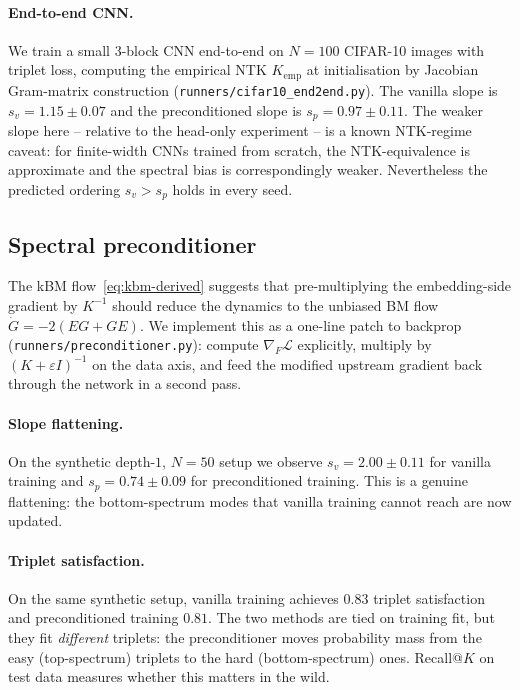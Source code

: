 \documentclass[11pt]{article}
\theoremstyle{definition}
\theoremstyle{plain}
\begin{document}
\paragraph{End-to-end CNN.}
We train a small $3$-block CNN end-to-end on $N=100$ CIFAR-10 images with
triplet loss, computing the empirical NTK $K_{\mathrm{emp}}$ at
initialisation by Jacobian Gram-matrix construction
(\texttt{runners/cifar10\_end2end.py}). The vanilla slope is
$s_v=1.15\pm0.07$ and the preconditioned slope is $s_p=0.97\pm0.11$. The
weaker slope here -- relative to the head-only experiment -- is a known
NTK-regime caveat: for finite-width CNNs trained from scratch, the
NTK-equivalence is approximate and the spectral bias is correspondingly
weaker. Nevertheless the predicted ordering $s_v>s_p$ holds in every seed.

\subsection{Spectral preconditioner}
\label{sec:precond}

The kBM flow~\eqref{eq:kbm-derived} suggests that pre-multiplying the
embedding-side gradient by $K^{-1}$ should reduce the dynamics to the
unbiased BM flow $\dot G=-2(EG+GE)$. We implement this as a one-line patch
to backprop (\texttt{runners/preconditioner.py}): compute $\nabla_F\mathcal{L}$
explicitly, multiply by $(K+\varepsilon I)^{-1}$ on the data axis, and feed
the modified upstream gradient back through the network in a second pass.

\paragraph{Slope flattening.}
On the synthetic depth-$1$, $N=50$ setup we observe
$s_v=2.00\pm0.11$ for vanilla training and $s_p=0.74\pm0.09$ for
preconditioned training. This is a genuine flattening: the bottom-spectrum
modes that vanilla training cannot reach are now updated.

\paragraph{Triplet satisfaction.}
On the same synthetic setup, vanilla training achieves $0.83$ triplet
satisfaction and preconditioned training $0.81$. The two methods are tied on
training fit, but they fit \emph{different} triplets: the preconditioner
moves probability mass from the easy (top-spectrum) triplets to the hard
(bottom-spectrum) ones. Recall@$K$ on test data measures whether this
matters in the wild.
\end{document}
